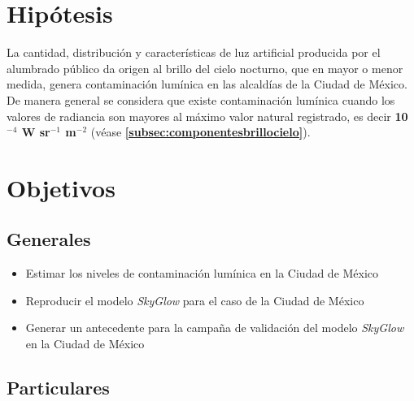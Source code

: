 \section{Hipótesis}

\vspace{5mm}

La cantidad, distribución y características de luz artificial producida por el alumbrado público da origen al brillo del cielo nocturno, que en mayor o menor medida, genera contaminación lumínica en las alcaldías de la Ciudad de México.\\

De manera general se considera que existe contaminación lumínica cuando los valores de radiancia son mayores al máximo valor natural registrado, es decir \textbf{10$^{-4}$ W sr$^{-1}$  m$^{-2}$} (véase \textbf{\autoref{subsec:componentesbrillocielo}}).\\

\section{Objetivos}

\vspace{5mm}

\subsection{Generales}

\vspace{5mm}

\begin{itemize}

	\item Estimar los niveles de contaminación lumínica en la Ciudad de México 

    \item Reproducir el modelo \textit{SkyGlow} para el caso de la Ciudad de México
    
    \item Generar un antecedente para la campaña de validación del modelo \textit{SkyGlow} en la Ciudad de México
    
\end{itemize}

\vspace{5mm}

\subsection{Particulares}

